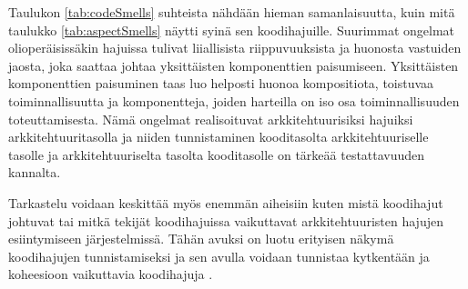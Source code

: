 \documentclass[finnish]{tktltiki2}
\numberwithin{table}{section}
\theoremstyle{definition}
\theoremstyle{remark}
\begin{document}
\begin{table}[h]
	\centering
	\setlength{\extrarowheight}{1pt}%
	\caption{Olioperäisten koodihajujen ja arkkitehtuuristen hajujen suhde, sekä niiden syyt.}
	\label{tab:codeSmells}
\end{table}


\noindent
Taulukon \ref{tab:codeSmells} suhteista nähdään hieman samanlaisuutta, kuin mitä taulukko \ref{tab:aspectSmells} näytti syinä sen koodihajuille. Suurimmat ongelmat olioperäisissäkin hajuissa tulivat liiallisista riippuvuuksista ja huonosta vastuiden jaosta, joka saattaa johtaa yksittäisten komponenttien paisumiseen. Yksittäisten komponenttien paisuminen taas luo helposti huonoa kompositiota, toistuvaa toiminnallisuutta ja komponentteja, joiden harteilla on iso osa toiminnallisuuden toteuttamisesta. Nämä ongelmat realisoituvat arkkitehtuurisiksi hajuiksi arkkitehtuuritasolla ja niiden tunnistaminen kooditasolta arkkitehtuuriselle tasolle ja arkkitehtuuriselta tasolta kooditasolle on tärkeää testattavuuden kannalta.



Tarkastelu voidaan keskittää myös enemmän aiheisiin kuten mistä koodihajut johtuvat tai mitkä tekijät koodihajuissa vaikuttavat arkkitehtuuristen hajujen esiintymiseen järjestelmissä. Tähän avuksi on luotu erityisen näkymä koodihajujen tunnistamiseksi ja sen avulla voidaan tunnistaa kytkentään ja koheesioon vaikuttavia koodihajuja \citep{fontana_towards_2015}. 
\end{document}
